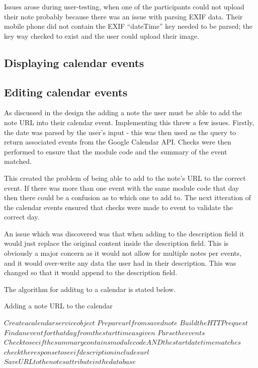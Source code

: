 Issues arose during user-testing, when one of the participants could not upload their note probably because there was an issue with parsing EXIF data. Their mobile phone did not contain the EXIF ``dateTime'' key needed to be parsed; the key way checked to exist and the user could upload their image.

\subsection{Displaying calendar events}


\subsection{Editing calendar events}
As discussed in the design the adding a note the user must be able to add the note URL into their calendar event. Implementing this threw a few issues. Firstly, the date was parsed by the user's input - this was then used as the query to return associated events from the Google Calendar API. Checks were then performed to ensure that the module code and the summary of the event matched.

This created the problem of being able to add to the note's URL to the correct event. If there was more than one event with the same module code that day then there could be a confusion as to which one to add to. The next itteration of the calendar events ensured that checks were made to event to validate the correct day.

An issue which was discovered was that when adding to the description field it would just replace the original content inside the description field. This is obviously a major concern as it would not allow for multiple notes per events, and it would over-write any data the user had in their description. This was changed so that it would append to the description field.

The algorithm for additng to a calendar is stated below.
\begin{algorithm}
  \caption{Adding a note URL to the calendar}
  \label{algorithm:threshold1}
  \begin{algorithmic}[1]
      \State $Create a calendar service object$
      \State $Prepare url from saved note$
      \State $Build the HTTP request$
      \State $Find an event for that day from the start time as given$
      \State $Parse the events$
      \State $Check to see if the summary contains module code AND the start date time matches$
        \State $check the response to see if description includes url$
        \State $Save URL to the notes attribute in the database$
      \EndIf
  \end{algorithmic}
\end{algorithm}

